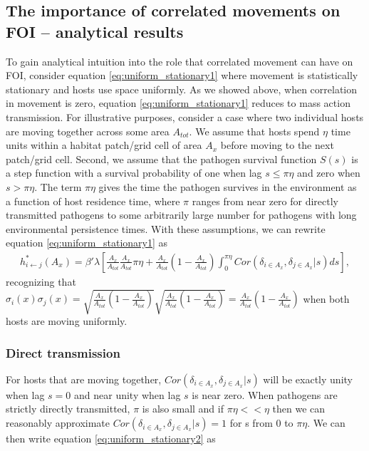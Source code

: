 \documentclass[letterpaper]{article}
\begin{document}
\subsection*{The importance of correlated movements on FOI -- analytical results}

To gain analytical intuition into the role that correlated movement can have on FOI, consider equation \ref{eq:uniform_stationary1} where movement is statistically stationary and hosts use space uniformly.  As we showed above, when correlation in movement is zero, equation \ref{eq:uniform_stationary1} reduces to mass action transmission. 
For illustrative purposes, consider a case where two individual hosts are moving together across some area $A_{tot}$. We assume that hosts spend $\eta$ time units within a habitat patch/grid cell of area $A_x$ before moving to the next patch/grid cell. Second, we assume that the pathogen survival function $S(s)$ is a step function with a survival probability of one when lag $s \leq \pi \eta$ and zero when $s > \pi \eta$.  
The term $\pi \eta$ gives the time the pathogen survives in the environment as a function of host residence time, where $\pi$ ranges from near zero for directly transmitted pathogens to some arbitrarily large number for pathogens with long environmental persistence times.  With these assumptions, we can rewrite equation \ref {eq:uniform_stationary1} as 
\begin{equation}
    \begin{aligned}
        h^*_{i \leftarrow j}(A_x) = \beta' \lambda \left[\frac{A_x}{A_{tot}}\frac{A_x}{A_{tot}} \pi \eta + \frac{A_x}{A_{tot}}(1 - \frac{A_x}{A_{tot}}) \int_{0}^{\pi \eta} Cor(\delta_{i \in A_x}, \delta_{j \in A_x} | s) ds\right],
    \end{aligned}
    \label{eq:uniform_stationary2}
\end{equation}
recognizing that $\sigma_i(x) \sigma_j(x) = \sqrt{\frac{A_x}{A_{tot}}(1 - \frac{A_x}{A_{tot}})}\sqrt{\frac{A_x}{A_{tot}}(1 - \frac{A_x}{A_{tot}})} = \frac{A_x}{A_{tot}}(1 - \frac{A_x}{A_{tot}})$ when both hosts are moving uniformly.

\subsubsection*{Direct transmission}

For hosts that are moving together, $Cor(\delta_{i \in A_x}, \delta_{j \in A_x} | s)$ will be exactly unity when lag $s = 0$ and near unity when lag $s$ is near zero. When pathogens are strictly directly transmitted, $\pi$ is also small and if $\pi \eta << \eta$ then we can reasonably approximate $Cor(\delta_{i \in A_x}, \delta_{j \in A_x} | s) = 1$ for s from 0 to $\pi \eta$.  We can then write equation \ref{eq:uniform_stationary2} as 
\end{document}
